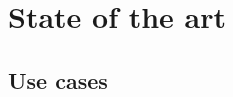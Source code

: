 \documentclass[8pt]{beamer}
\begin{document}
\section{State of the art}
	\subsection{Use cases}
		


%		
%		
%		
%		
%		
%		
\end{document}
